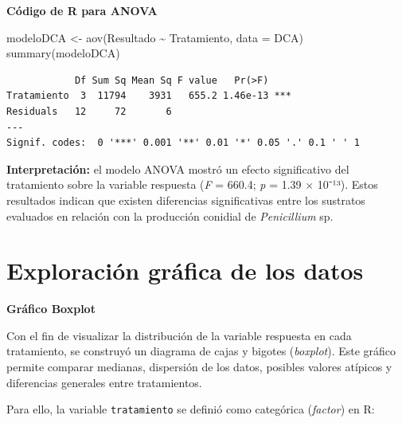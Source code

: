 \documentclass[
  spanish,
  letterpaper,
  DIV=11,
  numbers=noendperiod]{scrreprt}
\newenvironment{Shaded}{\begin{snugshade}}{\end{snugshade}}
\newcommand{\AttributeTok}[1]{\textcolor[rgb]{0.40,0.45,0.13}{#1}}
\newcommand{\FunctionTok}[1]{\textcolor[rgb]{0.28,0.35,0.67}{#1}}
\newcommand{\NormalTok}[1]{\textcolor[rgb]{0.00,0.23,0.31}{#1}}
\newcommand{\OtherTok}[1]{\textcolor[rgb]{0.00,0.23,0.31}{#1}}
\newcommand{\SpecialCharTok}[1]{\textcolor[rgb]{0.37,0.37,0.37}{#1}}
\begin{document}
\textbf{Código de R para ANOVA}

\begin{Shaded}
\begin{Highlighting}[]
\NormalTok{modeloDCA }\OtherTok{\textless{}{-}} \FunctionTok{aov}\NormalTok{(Resultado }\SpecialCharTok{\textasciitilde{}}\NormalTok{ Tratamiento, }\AttributeTok{data =}\NormalTok{ DCA)}
\FunctionTok{summary}\NormalTok{(modeloDCA)}
\end{Highlighting}
\end{Shaded}

\begin{verbatim}
            Df Sum Sq Mean Sq F value   Pr(>F)    
Tratamiento  3  11794    3931   655.2 1.46e-13 ***
Residuals   12     72       6                     
---
Signif. codes:  0 '***' 0.001 '**' 0.01 '*' 0.05 '.' 0.1 ' ' 1
\end{verbatim}

\textbf{Interpretación:} el modelo ANOVA mostró un efecto significativo
del tratamiento sobre la variable respuesta (\emph{F} = 660.4; \emph{p}
= 1.39 × 10⁻¹³). Estos resultados indican que existen diferencias
significativas entre los sustratos evaluados en relación con la
producción conidial de \emph{Penicillium} sp.

\section{Exploración gráfica de los
datos}\label{exploraciuxf3n-gruxe1fica-de-los-datos}

\textbf{Gráfico Boxplot}

Con el fin de visualizar la distribución de la variable respuesta en
cada tratamiento, se construyó un diagrama de cajas y bigotes
(\emph{boxplot}). Este gráfico permite comparar medianas, dispersión de
los datos, posibles valores atípicos y diferencias generales entre
tratamientos.

Para ello, la variable \texttt{tratamiento} se definió como categórica
(\emph{factor}) en R:

\begin{Shaded}
\end{Shaded}
\end{document}
